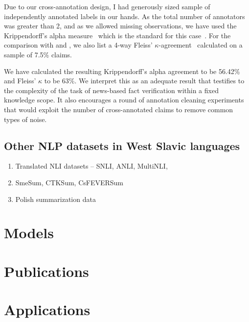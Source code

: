 Due to our cross-annotation design, I had generously sized sample of independently annotated labels in our hands.
As the total number of annotators was greater than 2, and as we allowed missing observations, we have used the Krippendorff's alpha measure~\cite{krippendorff1970} which is the standard for this case~\cite{hayes2007krippendorff}.
For the comparison with \cite{fever} and \cite{norregaard2021danfever}, we also list a 4-way Fleiss' $\kappa$-agreement~\cite{fleiss1971measuring} calculated on a sample of 7.5\% claims.

We have calculated the resulting Krippendorff's alpha agreement to be 56.42\% and Fleiss' $\kappa$ to be 63\%.
We interpret this as an adequate result that testifies to the complexity of the task of news-based fact verification within a fixed knowledge scope.
It also encourages a round of annotation cleaning experiments that would exploit the number of cross-annotated claims to remove common types of noise.

\subsection{Other NLP datasets in West Slavic languages}
\begin{enumerate}
    \item {\techbf Translated NLI datasets} -- SNLI, ANLI, MultiNLI, 
    \item SmeSum, CTKSum, CsFEVERSum
    \item Polish summarization data
\end{enumerate}
\section{Models}
\label{sec:models}
\section{Publications}
\label{sec:publications}
\section{Applications}
\label{sec:applications}

